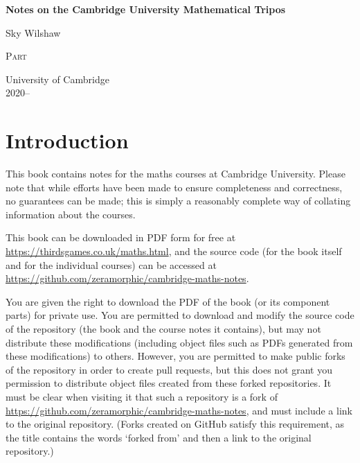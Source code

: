 \documentclass{book}
\begin{document}
\begin{titlepage}
    \begin{center}
        \vspace*{1cm}

        \Huge
        \textbf{Notes on the Cambridge University Mathematical Tripos}

        \vspace{0.5cm}
        \LARGE
        Sky Wilshaw

        \vfill

        \Huge
        \textsc{Part \yearnumber}

        \vfill

        \Large
        University of Cambridge\\
        2020--\the\year{}

    \end{center}
\end{titlepage}

\dominitoc{}

\setcounter{tocdepth}{0}
\tableofcontents
\newpage
\setcounter{tocdepth}{3}

\chapter*{Introduction}
This book contains notes for the maths courses at Cambridge University.
Please note that while efforts have been made to ensure completeness and correctness, no guarantees can be made; this is simply a reasonably complete way of collating information about the courses.

This book can be downloaded in PDF form for free at \url{https://thirdsgames.co.uk/maths.html}, and the source code (for the book itself and for the individual courses) can be accessed at \url{https://github.com/zeramorphic/cambridge-maths-notes}.

You are given the right to download the PDF of the book (or its component parts) for private use.
You are permitted to download and modify the source code of the repository (the book and the course notes it contains), but may not distribute these modifications (including object files such as PDFs generated from these modifications) to others.
However, you are permitted to make public forks of the repository in order to create pull requests, but this does not grant you permission to distribute object files created from these forked repositories.
It must be clear when visiting it that such a repository is a fork of \url{https://github.com/zeramorphic/cambridge-maths-notes}, and must include a link to the original repository.
(Forks created on GitHub satisfy this requirement, as the title contains the words `forked from' and then a link to the original repository.)
\end{document}
